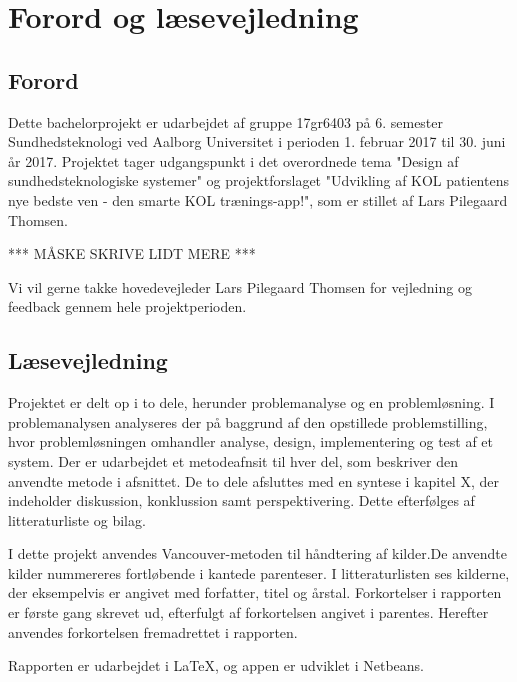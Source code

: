 \chapter*{Forord og læsevejledning}

\section*{Forord}
Dette bachelorprojekt er udarbejdet af gruppe 17gr6403 på 6. semester Sundhedsteknologi ved Aalborg Universitet i perioden 1. februar 2017 til 30. juni år 2017. Projektet tager udgangspunkt i det overordnede tema "Design af sundhedsteknologiske systemer" og projektforslaget "Udvikling af KOL patientens nye bedste ven - den smarte KOL trænings-app!", som er stillet af Lars Pilegaard Thomsen. 

*** MÅSKE SKRIVE LIDT MERE ***

Vi vil gerne takke hovedevejleder Lars Pilegaard Thomsen for vejledning og feedback gennem hele projektperioden.

\section*{Læsevejledning}
Projektet er delt op i to dele, herunder problemanalyse og en problemløsning. I problemanalysen analyseres der på baggrund af den opstillede problemstilling, hvor problemløsningen omhandler analyse, design, implementering og test af et system. Der er udarbejdet et metodeafnsit til hver del, som beskriver den anvendte metode i afsnittet. De to dele afsluttes med en syntese i kapitel X, der indeholder diskussion, konklussion samt perspektivering. Dette efterfølges af litteraturliste og bilag. 

I dette projekt anvendes Vancouver-metoden til håndtering af kilder.De anvendte kilder nummereres fortløbende i kantede parenteser. I litteraturlisten ses kilderne, der eksempelvis er angivet med forfatter, titel og årstal. Forkortelser i rapporten er første gang skrevet ud, efterfulgt af forkortelsen angivet i parentes. Herefter anvendes forkortelsen fremadrettet i rapporten.

Rapporten er udarbejdet i \LaTeX, og appen er udviklet i Netbeans.